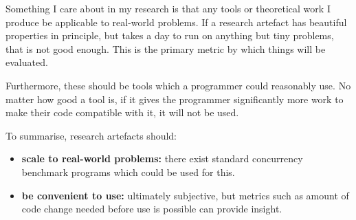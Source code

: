 Something I care about in my research is that any tools or theoretical
work I produce be applicable to real-world problems. If a research
artefact has beautiful properties in principle, but takes a day to run
on anything but tiny problems, that is not good enough. This is the
primary metric by which things will be evaluated.

Furthermore, these should be tools which a programmer could reasonably
use. No matter how good a tool is, if it gives the programmer
significantly more work to make their code compatible with it, it will
not be used.

To summarise, research artefacts should:

\begin{itemize}
\item \textbf{scale to real-world problems:} there exist standard
  concurrency benchmark programs which could be used for this.

\item \textbf{be convenient to use:} ultimately subjective, but
  metrics such as amount of code change needed before use is possible
  can provide insight.
\end{itemize}
